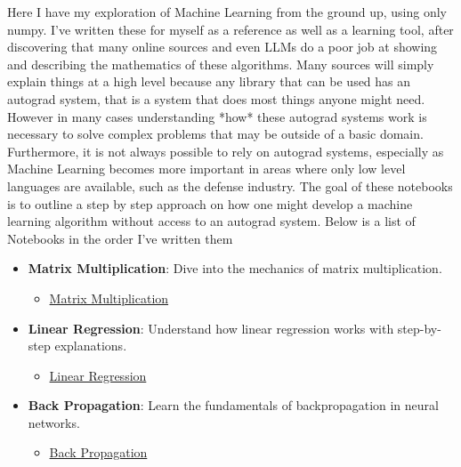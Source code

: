 \documentclass{article}
\begin{document}
Here I have my exploration of Machine Learning from the ground up, using only numpy. I've written these for myself as a reference as well as a learning tool, after discovering that many online sources and even LLMs do a poor job at showing and describing the mathematics of these algorithms. Many sources will simply explain things at a high level because any library that can be used has an autograd system, that is a system that does most things anyone might need. However in many cases understanding *how* these autograd systems work is necessary to solve complex problems that may be outside of a basic domain. Furthermore, it is not always possible to rely on autograd systems, especially as Machine Learning becomes more important in areas where only low level languages are available, such as the defense industry. The goal of these notebooks is to outline a step by step approach on how one might develop a machine learning algorithm without access to an autograd system. Below is a list of Notebooks in the order I've written them

\begin{itemize}
    \item \textbf{Matrix Multiplication}: Dive into the mechanics of matrix multiplication.
    \begin{itemize}
        \item \href{/notebooks/StartingFromTheBasicsMatrixMultiplication.ipynb}{Matrix Multiplication}
    \end{itemize}
        \item \textbf{Linear Regression}: Understand how linear regression works with step-by-step explanations.
    \begin{itemize}
        \item \href{/notebooks/StartingFromTheBasicsLinearRegression.ipynb}{Linear Regression}
    \end{itemize}
    \item \textbf{Back Propagation}: Learn the fundamentals of backpropagation in neural networks.
    \begin{itemize}
        \item \href{/notebooks/StartingFromTheBasicsBackPropagation.ipynb}{Back Propagation}
    \end{itemize}


\end{itemize}
\end{document}
